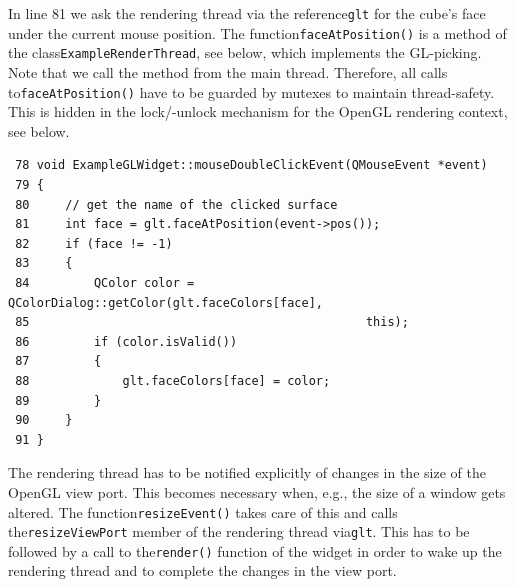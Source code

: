 \documentclass[prodmode,acmtopc]{acmsmall}
\begin{document}
In line 81 we ask the rendering thread via the reference\lstinline|glt| for the cube's face under the current mouse position.
%
The function\lstinline|faceAtPosition()| is a method of the class\lstinline|ExampleRenderThread|, see below, which implements the GL-picking.
%
Note that we call the method from the main thread.
%
Therefore, all calls to\lstinline|faceAtPosition()| have to be guarded by mutexes to maintain thread-safety.
%
This is hidden in the lock/-unlock mechanism for the OpenGL rendering context, see below.
\begin{lstlisting}
 78 void ExampleGLWidget::mouseDoubleClickEvent(QMouseEvent *event)
 79 {
 80     // get the name of the clicked surface
 81     int face = glt.faceAtPosition(event->pos());
 82     if (face != -1)
 83     {
 84         QColor color = QColorDialog::getColor(glt.faceColors[face],
 85                                               this);
 86         if (color.isValid())
 87         {
 88             glt.faceColors[face] = color;
 89         }
 90     }
 91 }
\end{lstlisting}
%
%
The rendering thread has to be notified explicitly of changes in the size of the OpenGL view port.
%
%
This becomes necessary when, e.g., the size of a window gets altered.
%
The function\lstinline|resizeEvent()| takes care of this and calls the\lstinline|resizeViewPort| member of the rendering thread via\lstinline|glt|.
%
This has to be followed by a call to the\lstinline|render()| function of the widget in order to wake up the rendering thread and to complete the changes in the view port.
\end{document}
